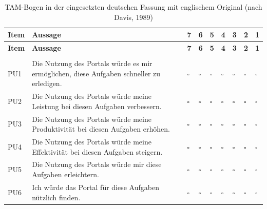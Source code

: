 \begin{longtable}{@{}L{1.15cm}L{8.45cm}*{7}{>{\centering\arraybackslash}p{0.5cm}}@{}}
	\caption[TAM-Bogen]{TAM-Bogen in der eingesetzten deutschen Fassung mit englischem Original (nach Davis, 1989)}
	\label{tab:tam-bogen}\\
	\toprule
	\textbf{Item} & \textbf{Aussage} & \textbf{7} & \textbf{6} & \textbf{5} & \textbf{4} & \textbf{3} & \textbf{2} & \textbf{1} \\
	\midrule
	\endfirsthead
	\toprule
	\textbf{Item} & \textbf{Aussage} & \textbf{7} & \textbf{6} & \textbf{5} & \textbf{4} & \textbf{3} & \textbf{2} & \textbf{1} \\
	\midrule
	\endhead
	\bottomrule
	\endfoot
	 \\
	PU1 & Die Nutzung des Portals würde es mir ermöglichen, diese Aufgaben schneller zu erledigen.  & $\square$ & $\square$ & $\square$ & $\square$ & $\square$ & $\square$ & $\square$ \\
	PU2 & Die Nutzung des Portals würde meine Leistung bei diesen Aufgaben verbessern.  & $\square$ & $\square$ & $\square$ & $\square$ & $\square$ & $\square$ & $\square$ \\
	PU3 & Die Nutzung des Portals würde meine Produktivität bei diesen Aufgaben erhöhen.  & $\square$ & $\square$ & $\square$ & $\square$ & $\square$ & $\square$ & $\square$ \\
	PU4 & Die Nutzung des Portals würde meine Effektivität bei diesen Aufgaben steigern.  & $\square$ & $\square$ & $\square$ & $\square$ & $\square$ & $\square$ & $\square$ \\
	PU5 & Die Nutzung des Portals würde mir diese Aufgaben erleichtern.  & $\square$ & $\square$ & $\square$ & $\square$ & $\square$ & $\square$ & $\square$ \\
	PU6 & Ich würde das Portal für diese Aufgaben nützlich finden.  & $\square$ & $\square$ & $\square$ & $\square$ & $\square$ & $\square$ & $\square$ \\

\end{longtable}
